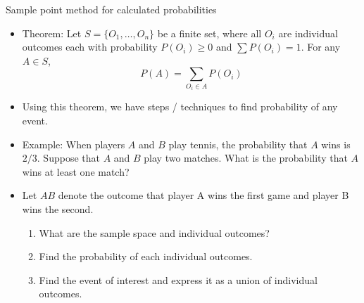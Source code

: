 \documentclass{article}
\newcommand{\vecn}[2]{#1_1, \ldots, #1_{#2}}		%
\begin{document}
Sample point method for calculated probabilities\bigskip
\begin{itemize}
    \item Theorem: Let $S = \{\vecn{O}{n}\}$ be a finite set, where all $O_i$ are individual outcomes each with probability $P(O_i) \ge 0$ and $\sum P(O_i) = 1$. For any $A \in S$,
    \[P(A) = \sum_{O_i \in A} P(O_i)\]
    \item Using this theorem, we have steps / techniques to find probability of any event.\newpage
    \item Example: When players $A$ and $B$ play tennis, the probability that $A$ wins is $2/3$. Suppose that $A$ and $B$ play two matches. What is the probability that $A$ wins at least one match? 
    \item[] Let $AB$ denote the outcome that player A wins the first game and player B wins the second.
    \begin{enumerate}
        \item What are the sample space and individual outcomes?\vspace{30pt}
        \item Find the probability of each individual outcomes.\vspace{30pt}
        \item Find the event of interest and express it as a union of individual outcomes.    \vspace{30pt}
    \end{enumerate}
\end{itemize}\bigskip
\end{document}
